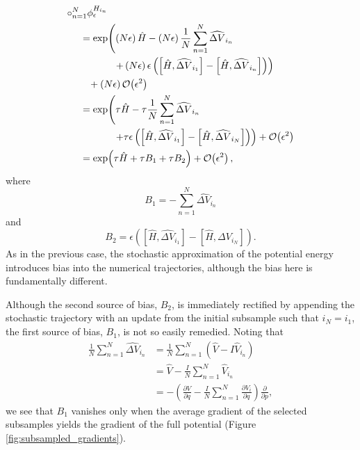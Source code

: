 \documentclass{article}
\begin{document}
%
\begin{align*}
\circ_{n = 1}^{N} \phi^{H_{i_{n}}}_{\epsilon}
& \\
& \hspace{-10mm} =
\exp \! \left( 
\left( N \epsilon \right) \hat{H} 
- \left( N \epsilon \right) \frac{1}{N} \sum_{n = 1}^{N}  \widehat{ \Delta V}_{i_{n}}
\right.
\\
& \hspace{2mm} \left.
+ \left( N \epsilon \right) \epsilon 
\left( \left[ \hat{H}, \widehat{ \Delta V}_{i_{1}} \right] 
- \left[ \hat{H}, \widehat{ \Delta V}_{i_{n}} \right] \right) 
\right)
\\
& \hspace{-7mm}
+ \left(N \epsilon \right) \mathcal{O} \! \left( \epsilon^{2} \right)
\\
& \hspace{-10mm} =
\exp \! \left( \tau \hat{H} - \tau \frac{1}{N} \sum_{n = 1}^{N} \widehat{ \Delta V}_{i_{n}}
\right.
\\
& \hspace{2mm} \left.
+ \tau \epsilon 
\left( \left[ \hat{H}, \widehat{ \Delta V}_{i_{1}} \right] 
- \left[ \hat{H}, \widehat{ \Delta V}_{i_{N}} \right] \right)
\right)
+ \mathcal{O} \! \left( \epsilon^{2} \right)
\\
& \hspace{-10mm} =
\exp \! \left( \tau \hat{H} + \tau B_{1} + \tau B_{2} \right)
+ \mathcal{O} \! \left( \epsilon^{2} \right),
\end{align*}
%
where
%
\begin{equation*}
B_{1} = - \sum_{n = 1}^{N} \widehat{ \Delta V}_{i_{n}}
\end{equation*}
%
and
%
\begin{equation*}
B_{2} = \epsilon 
\left( \left[ \hat{H}, \widehat{ \Delta V}_{i_{1}} \right] 
- \left[ \hat{H}, \widehat{ \Delta V}_{i_{N}} \right] \right).
\end{equation*}
%
As in the previous case, the stochastic approximation of the potential energy
introduces bias into the numerical trajectories, although the bias here is 
fundamentally different.

Although the second source of bias, $B_{2}$, is immediately rectified by appending the 
stochastic trajectory with an update from the initial subsample such that $i_{N} = i_{1}$, 
the first source of bias, $B_{1}$, is not so easily remedied.  Noting that
%
\begin{align*}
\frac{1}{N} \sum_{n = 1}^{N}  \widehat{ \Delta V}_{i_{n}}
&=
\frac{1}{N} \sum_{n = 1}^{N} \left( \hat{V} - I \hat{V}_{i_{n}} \right)
\\
&=
\hat{V} - \frac{I}{N} \sum_{n = 1}^{N} \hat{V}_{i_{n}}
\\
&=
- \left( \frac{ \partial V }{ \partial q }  - \frac{I}{N} \sum_{n = 1}^{N} \frac{ \partial V_{i} }{ \partial q }
\right) \frac{ \partial }{ \partial p },
\end{align*}
%
we see that $B_{1}$ vanishes only when the average gradient of the selected 
subsamples yields the gradient of the full potential (Figure \ref{fig:subsampled_gradients}).
\end{document}
